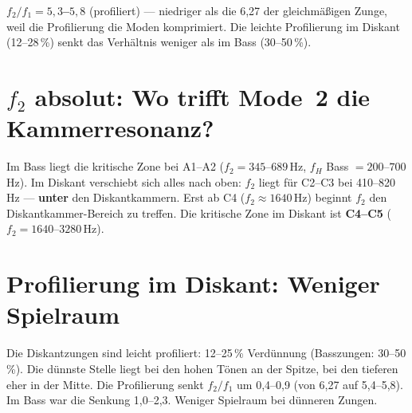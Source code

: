 \documentclass[11pt,a4paper]{article}
\begin{document}
\begin{center}
\end{center}

\begin{tcolorbox}[colframe=keygreen, colback=green!5!white]
\textbf{$f_2/f_1 = 5{,}3$--$5{,}8$} (profiliert) --- niedriger als die 6,27
der gleichmäßigen Zunge, weil die Profilierung die Moden komprimiert.
Die leichte Profilierung im Diskant (12--28\,\%) senkt das Verhältnis
weniger als im Bass (30--50\,\%).
\end{tcolorbox}

\section{$f_2$ absolut: Wo trifft Mode~2 die Kammerresonanz?}

Im Bass liegt die kritische Zone bei A1--A2 ($f_2 = 345$--$689$\,Hz,
$f_H$ Bass $= 200$--$700$\,Hz). Im Diskant verschiebt sich alles nach oben:
$f_2$ liegt für C2--C3 bei 410--820\,Hz --- \textbf{unter} den Diskantkammern.
Erst ab C4 ($f_2 \approx 1640$\,Hz) beginnt $f_2$ den Diskantkammer-Bereich
zu treffen. Die kritische Zone im Diskant ist \textbf{C4--C5}
($f_2 = 1640$--$3280$\,Hz).

\section{Profilierung im Diskant: Weniger Spielraum}

Die Diskantzungen sind leicht profiliert: 12--25\,\% Verdünnung
(Basszungen: 30--50\,\%). Die dünnste Stelle liegt bei den hohen Tönen
an der Spitze, bei den tieferen eher in der Mitte. Die Profilierung senkt
$f_2/f_1$ um 0,4--0,9 (von 6,27 auf 5,4--5,8). Im Bass war die Senkung
1,0--2,3. Weniger Spielraum bei dünneren Zungen.
\end{document}
